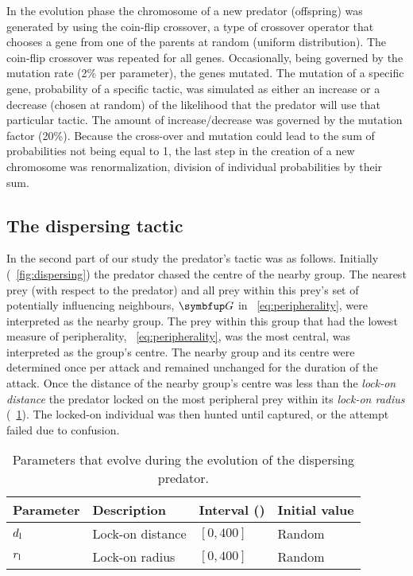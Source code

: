 In the evolution phase the chromosome of a new predator (offspring) was generated by using the coin-flip crossover, a type of crossover operator that chooses a gene from one of the parents at random (uniform distribution). The coin-flip crossover was repeated for all genes. Occasionally, being governed by the mutation rate (2\% per parameter), the genes mutated. The mutation of a specific gene, \ie probability of a specific tactic, was simulated as either an increase or a decrease (chosen at random) of the likelihood that the predator will use that particular tactic. The amount of increase/decrease was governed by the mutation factor (20\%). Because the cross-over and mutation could lead to the sum of probabilities not being equal to 1, the last step in the creation of a new chromosome was renormalization, \ie division of individual probabilities by their sum.

\subsection{The dispersing tactic}
\label{sec:dispersing}

In the second part of our study the predator's tactic was as follows. Initially (\figurename~\ref{fig:dispersing}) the predator chased the centre of the nearby group. The nearest prey (with respect to the predator) and all prey within this prey's set of potentially influencing neighbours, $\set{G}$ in \eq~\eqref{eq:peripherality}, were interpreted as the nearby group. The prey within this group that had the lowest measure of peripherality, \eq~\eqref{eq:peripherality}, \ie was the most central, was interpreted as the group's centre. The nearby group and its centre were determined once per attack and remained unchanged for the duration of the attack. Once the distance of the nearby group's centre was less than the \emph{lock-on distance} the predator locked on the most peripheral prey within its \emph{lock-on radius} (\tablename~\ref{tab:dispersing}). The locked-on individual was then hunted until captured, or the attempt failed due to confusion.

\begin{table}
	\caption{Parameters that evolve during the evolution of the dispersing predator.}
	\label{tab:dispersing}
	\begin{tabular}{llll}
		\toprule
		Parameter & Description & Interval (\si{\bodylength}) & Initial value\\
		\midrule
		$d_\textnormal{l}$ & Lock-on distance & $[0, 400]$ & Random\\
		$r_\textnormal{l}$ & Lock-on radius & $[0, 400]$ & Random\\
		\bottomrule
	\end{tabular}
\end{table}

